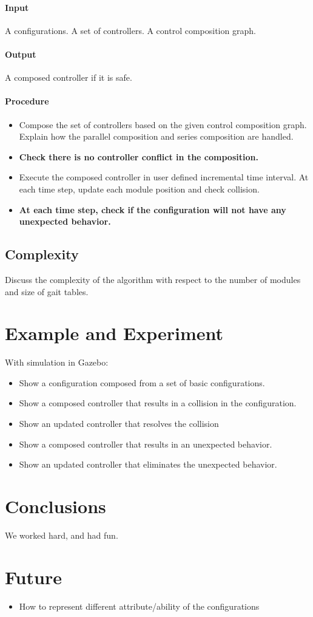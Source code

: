 \documentclass[12pt]{article}
\begin{document}
\paragraph{Input}
A configurations. A set of controllers. A control composition graph.
\paragraph{Output}
A composed controller if it is safe.
\paragraph{Procedure}
\begin{itemize}
\item Compose the set of controllers based on the given control composition graph. Explain how the parallel composition and series composition are handled.
\item\textbf{Check there is no controller conflict in the composition.}
\item Execute the composed controller in user defined incremental time interval. At each time step, update each module position and check collision.
\item \textbf{At each time step, check if the configuration will not have any unexpected behavior.}
\end{itemize}

\subsection{Complexity}
Discuss the complexity of the algorithm with respect to the number of modules and size of gait tables.

\section{Example and Experiment}
With simulation in Gazebo:
\begin{itemize}
\item Show a configuration composed from a set of basic configurations.
\item Show a composed controller that results in a collision in the configuration.
\item Show an updated controller that resolves the collision
\item Show a composed controller that results in an unexpected behavior.
\item Show an updated controller that eliminates the unexpected behavior.
\end{itemize}

\section{Conclusions}
We worked hard, and had fun.

\section{Future}
\begin{itemize}
\item How to represent different attribute/ability of the configurations
\end{itemize}
\end{document}
